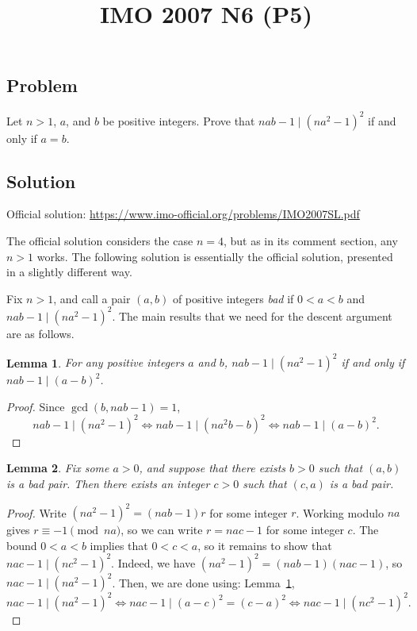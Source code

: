 \documentclass{article}
\title{IMO 2007 N6 (P5)}
\author{}
\date{}
\newtheorem{lemma}{Lemma}
\begin{document}
\maketitle



\subsection*{Problem}

Let $n > 1$, $a$, and $b$ be positive integers.
Prove that $nab - 1 \mid (na^2 - 1)^2$ if and only if $a = b$.



\subsection*{Solution}

Official solution: \url{https://www.imo-official.org/problems/IMO2007SL.pdf}

The official solution considers the case $n = 4$, but as in its comment section, any $n > 1$ works.
The following solution is essentially the official solution, presented in a slightly different way.

Fix $n > 1$, and call a pair $(a, b)$ of positive integers \emph{bad} if $0 < a < b$ and $nab - 1 \mid (na^2 - 1)^2$.
The main results that we need for the descent argument are as follows.

\begin{lemma}\label{2007n6-1}
For any positive integers $a$ and $b$, $nab - 1 \mid (na^2 - 1)^2$ if and only if $nab - 1 \mid (a - b)^2$.
\end{lemma}
\begin{proof}
Since $\gcd(b, nab - 1) = 1$,
\[ nab - 1 \mid (na^2 - 1)^2 \iff nab - 1 \mid (na^2 b - b)^2 \iff nab - 1 \mid (a - b)^2. \]
\end{proof}

\begin{lemma}\label{2007n6-2}
Fix some $a > 0$, and suppose that there exists $b > 0$ such that $(a, b)$ is a bad pair.
Then there exists an integer $c > 0$ such that $(c, a)$ is a bad pair.
\end{lemma}
\begin{proof}
Write $(na^2 - 1)^2 = (nab - 1) r$ for some integer $r$.
Working modulo $na$ gives $r \equiv -1 \pmod{na}$, so we can write $r = nac - 1$ for some integer $c$.
The bound $0 < a < b$ implies that $0 < c < a$, so it remains to show that $nac - 1 \mid (nc^2 - 1)^2$.
Indeed, we have $(na^2 - 1)^2 = (nab - 1)(nac - 1)$, so $nac - 1 \mid (na^2 - 1)^2$.
Then, we are done using: Lemma~\ref{2007n6-1},
\[ nac - 1 \mid (na^2 - 1)^2 \iff nac - 1 \mid (a - c)^2 = (c - a)^2 \iff nac - 1 \mid (nc^2 - 1)^2. \]
\end{proof}
\end{document}
